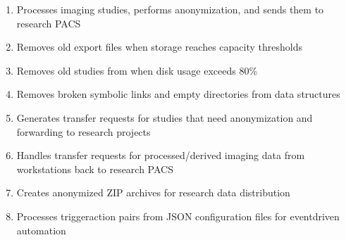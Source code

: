 \documentclass[letterpaper,10pt,english]{sphinxmanual}
\begin{document}
\begin{enumerate}
%
\item {} 
\sphinxAtStartPar
{\hyperref[\detokenize{Architecture/scripts/anonymizeAndSend::doc}]{}} \sphinxhyphen{} Processes imaging studies, performs anonymization, and sends them to research PACS

\item {} 
\sphinxAtStartPar
{\hyperref[\detokenize{Architecture/scripts/clearExports::doc}]{}} \sphinxhyphen{} Removes old export files when storage reaches capacity thresholds

\item {} 
\sphinxAtStartPar
{\hyperref[\detokenize{Architecture/scripts/clearOldFiles::doc}]{}} \sphinxhyphen{} Removes old studies from  when disk usage exceeds 80\%

\item {} 
\sphinxAtStartPar
{\hyperref[\detokenize{Architecture/scripts/clearStaleLinks::doc}]{}} \sphinxhyphen{} Removes broken symbolic links and empty directories from data structures

\item {} 
\sphinxAtStartPar
{\hyperref[\detokenize{Architecture/scripts/createTransferRequests::doc}]{}} \sphinxhyphen{} Generates transfer requests for studies that need anonymization and forwarding to research projects

\item {} 
\sphinxAtStartPar
{\hyperref[\detokenize{Architecture/scripts/createTransferRequestsForProcessed::doc}]{}} \sphinxhyphen{} Handles transfer requests for processed/derived imaging data from workstations back to research PACS

\item {} 
\sphinxAtStartPar
{\hyperref[\detokenize{Architecture/scripts/createZipFileCmd::doc}]{}} \sphinxhyphen{}  Creates anonymized ZIP archives for research data distribution

\item {} 
\sphinxAtStartPar
{\hyperref[\detokenize{Architecture/scripts/cron::doc}]{}} \sphinxhyphen{} Processes trigger\sphinxhyphen{}action pairs from JSON configuration files for event\sphinxhyphen{}driven automation


\end{enumerate}
\end{document}
